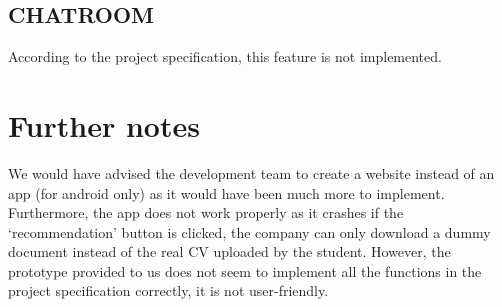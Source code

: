 \subsection{CHATROOM}\label{subsec:chatroom}
According to the project specification, this feature is not implemented.


\section{Further notes}\label{sec:further-notes}
We would have advised the development team to create a website instead of an app (for android only) as it would have been much more to implement. Furthermore, the app does not work properly as it crashes if the ‘recommendation’ button is clicked, the company can only download a dummy document instead of the real CV uploaded by the student.
However, the prototype provided to us does not seem to implement all the functions in the project specification correctly, it is not user-friendly.
